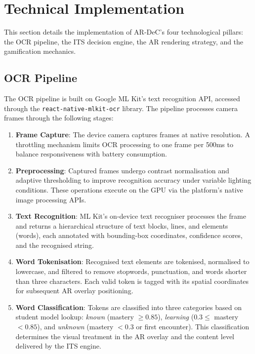 
\section{Technical Implementation}
\label{sec:implementation}

This section details the implementation of AR-DeC's four technological pillars: the OCR pipeline, the ITS decision engine, the AR rendering strategy, and the gamification mechanics.

\subsection{OCR Pipeline}
\label{subsec:ocr_pipeline}

The OCR pipeline is built on Google ML Kit's text recognition API, accessed through the \texttt{react-native-mlkit-ocr} library. The pipeline processes camera frames through the following stages:

\begin{enumerate}
    \item \textbf{Frame Capture}: The device camera captures frames at native resolution. A throttling mechanism limits OCR processing to one frame per 500ms to balance responsiveness with battery consumption.

    \item \textbf{Preprocessing}: Captured frames undergo contrast normalisation and adaptive thresholding to improve recognition accuracy under variable lighting conditions. These operations execute on the GPU via the platform's native image processing APIs.

    \item \textbf{Text Recognition}: ML Kit's on-device text recogniser processes the frame and returns a hierarchical structure of text blocks, lines, and elements (words), each annotated with bounding-box coordinates, confidence scores, and the recognised string.

    \item \textbf{Word Tokenisation}: Recognised text elements are tokenised, normalised to lowercase, and filtered to remove stopwords, punctuation, and words shorter than three characters. Each valid token is tagged with its spatial coordinates for subsequent AR overlay positioning.

    \item \textbf{Word Classification}: Tokens are classified into three categories based on student model lookup: \emph{known} (mastery $\geq 0.85$), \emph{learning} ($0.3 \leq$ mastery $< 0.85$), and \emph{unknown} (mastery $< 0.3$ or first encounter). This classification determines the visual treatment in the AR overlay and the content level delivered by the ITS engine.
\end{enumerate}

